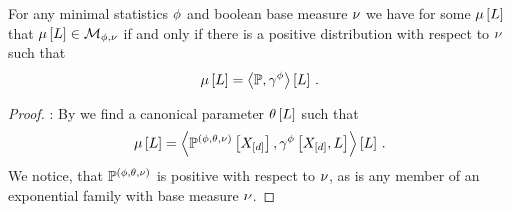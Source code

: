 \begin{theorem}\label{the:meanPolytopeInteriorCharacterization}
	For any minimal statistics $\phi$ and boolean base measure $\nu$ we have for some $\mu\left[L\right]$ that $\mu\left[L\right]\in\mathcal{M}_{\phi,\nu}$ if and only if there is a positive distribution with respect to $\nu$ such that
		\[ \mu\left[L\right] = \left\langle \mathbb{P},\gamma^{\phi}\right\rangle \left[ L \right] \, . \]
\end{theorem}
\begin{proof} 
	\proofrightsymbol: 
		By  we find a canonical parameter $\theta\left[L\right]$ such that
		\begin{align*}
			\mu\left[L\right] = \left\langle \mathbb{P}^{(\phi,\theta,\nu)}\left[X_{[d]}\right],\gamma^{\phi}\left[X_{[d]},L\right]\right\rangle \left[ L \right] \, .
		\end{align*}
		We notice, that $\mathbb{P}^{(\phi,\theta,\nu)}$ is positive with respect to $\nu$, as is any member of an exponential family with base measure $\nu$.
		

\end{proof}
